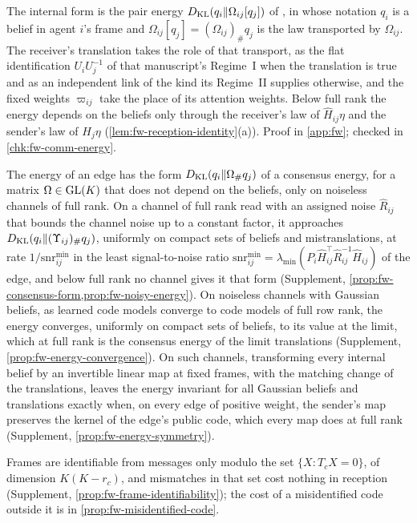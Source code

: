 The internal form is the pair energy $D_{\mathrm{KL}}(q_i\Vert\Omega_{ij}[q_j])$ of \citet{dennis2026participatory}, in whose notation $q_i$ is a belief in agent $i$'s frame and $\Omega_{ij}[q_j]=(\Omega_{ij})_\#q_j$ is the law transported by $\Omega_{ij}$. The receiver's translation takes the role of that transport, as the flat identification $U_iU_j^{-1}$ of that manuscript's Regime~I when the translation is true and as an independent link of the kind its Regime~II supplies otherwise, and the fixed weights $\varpi_{ij}$ take the place of its attention weights. Below full rank the energy depends on the beliefs only through the receiver's law of $\hat H_{ij}\eta$ and the sender's law of $H_j\eta$ (\cref{lem:fw-reception-identity}(a)). Proof in \cref{app:fw}; checked in \cref{chk:fw-comm-energy}.

The energy of an edge has the form $D_{\mathrm{KL}}(q_i\Vert\Omega_\#q_j)$ of a consensus energy, for a matrix $\Omega\in\mathrm{GL}(K)$ that does not depend on the beliefs, only on noiseless channels of full rank. On a channel of full rank read with an assigned noise $\hat R_{ij}$ that bounds the channel noise up to a constant factor, it approaches $D_{\mathrm{KL}}(q_i\Vert(\Upsilon_{ij})_\#q_j)$, uniformly on compact sets of beliefs and mistranslations, at rate $1/\mathrm{snr}^{\min}_{ij}$ in the least signal-to-noise ratio $\mathrm{snr}^{\min}_{ij}=\lambda_{\min}(P_i\hat H_{ij}^\top\hat R_{ij}^{-1}\hat H_{ij})$ of the edge, and below full rank no channel gives it that form (Supplement, \cref{prop:fw-consensus-form,prop:fw-noisy-energy}). On noiseless channels with Gaussian beliefs, as learned code models converge to code models of full row rank, the energy converges, uniformly on compact sets of beliefs, to its value at the limit, which at full rank is the consensus energy of the limit translations (Supplement, \cref{prop:fw-energy-convergence}). On such channels, transforming every internal belief by an invertible linear map at fixed frames, with the matching change of the translations, leaves the energy invariant for all Gaussian beliefs and translations exactly when, on every edge of positive weight, the sender's map preserves the kernel of the edge's public code, which every map does at full rank (Supplement, \cref{prop:fw-energy-symmetry}).

Frames are identifiable from messages only modulo the set $\{X:T_cX=0\}$, of dimension $K(K-r_c)$, and mismatches in that set cost nothing in reception (Supplement, \cref{prop:fw-frame-identifiability}); the cost of a misidentified code outside it is in \cref{prop:fw-misidentified-code}.

